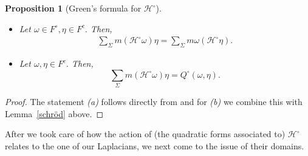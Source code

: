\documentclass[10pt]{amsart}
\newtheorem{proposition}[theorem]{Proposition}
\theoremstyle{definition}
\newcommand{\F}{{F}}
\renewcommand{\bullet}{{\circ}}
\begin{document}
\begin{proposition}[Green's formula for $\mathcal{H}^{\bullet}$]\label{green2}
\begin{itemize}
	\item [(a)]	Let $\omega\in F^\bullet,\eta\in \F^c.$ Then,
	\begin{align*}
		 		\sum_{\Sigma}m (\mathcal{H}^\bullet\omega)\eta = \sum_\Sigma m\omega(\mathcal{H^\bullet\eta}). %
		 	\end{align*}
	\item[(b)] Let $\omega,\eta\in \F^c.$ Then, 
	\begin{equation*}
			\sum_{\Sigma}m (\mathcal{H}^\bullet\omega)\eta =Q^{\bullet}(\omega,\eta).
	\end{equation*}
	\end{itemize}\end{proposition}
\begin{proof} The statement \emph{(a)} follows directly from  \cite[Lemma~2.1.]{GKS} and for \emph{(b)} we combine this with  Lemma~\ref{schröd} above.
\end{proof}



After we took care of how the action of (the quadratic forms associated to)  $\mathcal{H}^{\bullet}$ relates to the one of our Laplacians, we next come to the issue of their domains.
\end{document}

